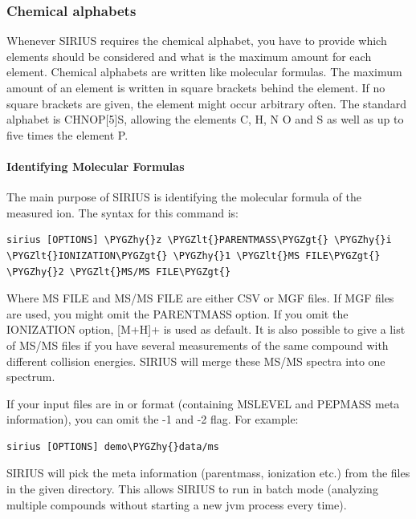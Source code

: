\documentclass[letterpaper,10pt,openany,oneside]{sphinxmanual}
\def\PYGZlt{\char`\<}
\def\PYGZgt{\char`\>}
\def\PYGZhy{\char`\-}
\begin{document}
\subsubsection{Chemical alphabets}
\label{commandline:alphabets}\label{commandline:chemical-alphabets}
Whenever SIRIUS requires the chemical alphabet, you have to provide which elements should be considered and what is the maximum amount for each element. Chemical alphabets are written like molecular formulas. The maximum amount of an element is written in square brackets behind the element. If no square brackets are given, the element might occur arbitrary often. The standard alphabet is CHNOP{[}5{]}S, allowing the elements C, H, N O and S as well as up to five times the element P.


\paragraph{Identifying Molecular Formulas}
\label{commandline:identifying-molecular-formulas}
The main purpose of SIRIUS is identifying the molecular formula of the measured ion. The syntax for this command is:

\begin{Verbatim}[commandchars=\\\{\}]
sirius [OPTIONS] \PYGZhy{}z \PYGZlt{}PARENTMASS\PYGZgt{} \PYGZhy{}i \PYGZlt{}IONIZATION\PYGZgt{} \PYGZhy{}1 \PYGZlt{}MS FILE\PYGZgt{} \PYGZhy{}2 \PYGZlt{}MS/MS FILE\PYGZgt{}
\end{Verbatim}

Where MS FILE and MS/MS FILE are either CSV or MGF files. If MGF files are used, you might omit the PARENTMASS option. If you omit the IONIZATION option, {[}M+H{]}+ is used as default. It is also possible to give a list of MS/MS files if you have several measurements of the same compound with different collision energies. SIRIUS will merge these MS/MS spectra into one spectrum.

If your input files are in  or  format (containing MSLEVEL and PEPMASS meta information), you can omit the -1 and -2 flag. For example:

\begin{Verbatim}[commandchars=\\\{\}]
sirius [OPTIONS] demo\PYGZhy{}data/ms
\end{Verbatim}

SIRIUS will pick the meta information (parentmass, ionization etc.) from the  files in the given directory. This allows SIRIUS to run in batch mode (analyzing multiple compounds without starting a new jvm process every time).
\end{document}
